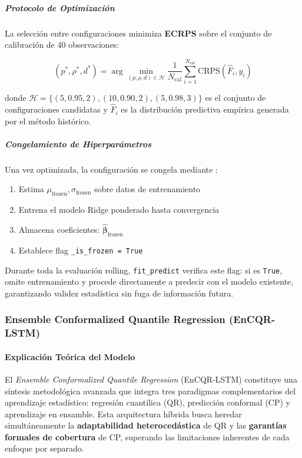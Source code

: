 \subparagraph{Protocolo de Optimización}

La selección entre configuraciones minimiza \textbf{ECRPS} sobre el conjunto de calibración de 40 observaciones:

\begin{equation}
(p^*, \rho^*, d^*) = \arg\min_{(p, \rho, d) \in \mathcal{H}} \frac{1}{N_{\text{cal}}} \sum_{i=1}^{N_{\text{cal}}} \text{CRPS}(\hat{F}_i, y_i)
\end{equation}

donde $\mathcal{H} = \{(5,0.95,2), (10,0.90,2), (5,0.98,3)\}$ es el conjunto de configuraciones candidatas y $\hat{F}_i$ es la distribución predictiva empírica generada por el método histórico.

\subparagraph{Congelamiento de Hiperparámetros}

Una vez optimizada, la configuración se congela mediante :

\begin{enumerate}
\item Estima $\mu_{\text{frozen}}, \sigma_{\text{frozen}}$ sobre datos de entrenamiento
\item Entrena el modelo Ridge ponderado hasta convergencia
\item Almacena coeficientes: $\hat{\boldsymbol{\beta}}_{\text{frozen}}$
\item Establece flag \texttt{\_is\_frozen = True}
\end{enumerate}

Durante toda la evaluación rolling, \texttt{fit\_predict} verifica este flag: si es \texttt{True}, omite entrenamiento y procede directamente a predecir con el modelo existente, garantizando validez estadística sin fuga de información futura.


\subsubsection{Ensemble Conformalized Quantile Regression (EnCQR-LSTM)}
\label{subsec:EnCQR-LSTM}
\paragraph{Explicación Teórica del Modelo}

El \textit{Ensemble Conformalized Quantile Regression} (EnCQR-LSTM) constituye una síntesis metodológica avanzada que integra tres paradigmas complementarios del aprendizaje estadístico: regresión cuantílica (QR), predicción conformal (CP) y aprendizaje en ensamble. Esta arquitectura híbrida busca heredar simultáneamente la \textbf{adaptabilidad heterocedástica} de QR y las \textbf{garantías formales de cobertura} de CP, superando las limitaciones inherentes de cada enfoque por separado.

